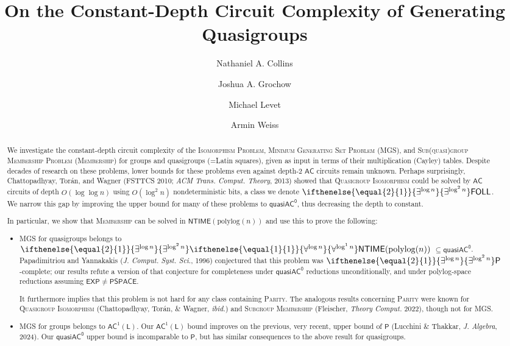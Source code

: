 \documentclass{article}
\title{On the Constant-Depth Circuit Complexity of Generating Quasigroups}
\author{Nathaniel A. Collins \and Joshua A. Grochow \and Michael Levet \and Armin Weiss}\date{}
\newcommand{\algprobm}[1]{\textsc{#1}\xspace}
\newcommand{\betacc}[1]{\ifthenelse{\equal{#1}{1}}{\exists^{\log n}}{\exists^{\log^{#1}n}}} %
\newcommand{\alphacc}[1]{\ifthenelse{\equal{#1}{1}}{\forall^{\log n}}{\forall^{\log^{#1}n}}} %
\newcommand*{\ComplexityClass}[1]{\ensuremath{\mathsf{#1}}\xspace}
\renewcommand{\P}{\ComplexityClass{P}}
\newcommand*{\EXP}{\ComplexityClass{EXP}}
\newcommand*{\LogSpace}{\ComplexityClass{L}}
\newcommand*{\PSPACE}{\ComplexityClass{PSPACE}}
\newcommand{\AC}{\ComplexityClass{AC}}
\newcommand{\qACz}{\ComplexityClass{quasiAC^0}}
\newcommand{\FOLL}{\ComplexityClass{FOLL}}
\newcommand{\NTIME}{\ComplexityClass{NTIME}}
\begin{document}
\maketitle

\begin{abstract}
We investigate the constant-depth 
circuit complexity 
of the \algprobm{Isomorphism Problem}, \algprobm{Minimum Generating Set Problem} (\algprobm{MGS}), and \algprobm{Sub(quasi)group Membership Problem} (\algprobm{Membership})  for groups and quasigroups (=Latin squares), given as input in terms of their multiplication (Cayley) tables.
Despite decades of research on these problems, lower bounds for these problems even against  depth-$2$ $\AC$ circuits remain unknown. Perhaps surprisingly, Chattopadhyay, Torán, and Wagner (FSTTCS 2010; \emph{ACM Trans. Comput. Theory}, 2013) showed that \algprobm{Quasigroup Isomorphism} could be solved by $\AC$ circuits of depth $O(\log \log n)$ using $O(\log^2 n)$ nondeterministic bits, a class we denote $\betacc{2}\FOLL$. We narrow this gap by improving the upper bound for many of these problems to $\qACz$, thus decreasing the depth to constant.

In particular, we show that \algprobm{Membership} can be solved in $\NTIME(\mathrm{polylog}(n))$ and use this to prove the following:
\begin{itemize}
\item \algprobm{MGS} for quasigroups belongs to $\betacc{2}\alphacc{1}\NTIME(\mathrm{polylog}(n))$ $\subseteq \qACz$. Papadimitriou and Yannakakis (\emph{J. Comput. Syst. Sci.}, 1996) conjectured that this problem was $\betacc{2}\P$-complete; our results refute a version of that conjecture for completeness under $\qACz$ reductions unconditionally, and under polylog-space reductions assuming $\EXP \neq \PSPACE$. 

It furthermore implies that this problem is not hard for any class containing \algprobm{Parity}. The analogous results concerning \algprobm{Parity} were known for \algprobm{Quasigroup Isomorphism} (Chattopadhyay, Tor\'an, \& Wagner, \emph{ibid.}) and \algprobm{Subgroup Membership} (Fleischer, \textit{Theory Comput.} 2022), though not for \algprobm{MGS}.

\item \algprobm{MGS} for groups belongs to $\AC^{1}(\LogSpace)$. Our $\AC^{1} (\LogSpace)$ bound improves on the previous, very recent, upper bound of $\mathsf{P}$ (Lucchini \& Thakkar, \textit{J. Algebra}, 2024). Our $\qACz$ upper bound is incomparable to $\P$, but has similar consequences to the above result for quasigroups. 


\end{itemize}
\end{abstract}
\end{document}
